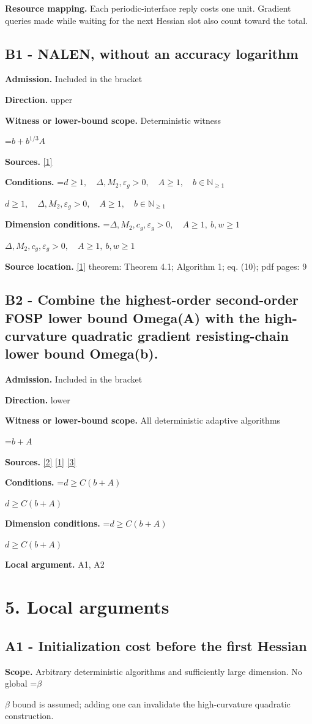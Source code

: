 \documentclass[10pt,a4paper]{article}
\newcommand{\AtlasMath}[1]{\par\begingroup\centering\setbox0=\hbox{$\displaystyle #1$}\ifdim\wd0>1.4\linewidth\typeout{ATLAS WIDE FORMULA: \the\wd0}\fi\ifdim\wd0>\linewidth\resizebox{\linewidth}{!}{\box0}\else\box0\fi\par\endgroup}
\newcommand{\AtlasInlineMath}[1]{\begingroup\setbox0=\hbox{$#1$}\ifdim\wd0>.4\linewidth\endgroup\AtlasMath{#1}\else\endgroup$#1$\fi}
\begin{document}
\textbf{Resource mapping.} Each periodic-interface reply costs one unit. Gradient queries made while waiting for the next Hessian slot also count toward the total.

\subsection{B1 - NALEN, without an accuracy logarithm}
\textbf{Admission.} Included in the bracket

\textbf{Direction.} upper

\textbf{Witness or lower-bound scope.} Deterministic witness

\AtlasMath{b+b^{1/3}A}
\textbf{Sources.} \href{https://arxiv.org/abs/2501.17488v3}{[1]}

\textbf{Conditions.} \AtlasInlineMath{d\ge1,\quad\Delta,M_2,\varepsilon_g>0,\quad A\ge1,\quad b\in\mathbb{N}_{\ge1}}

\textbf{Dimension conditions.} \AtlasInlineMath{\Delta,M_2,c_g,\varepsilon_g>0,\quad A\ge1,\ b,w\ge1}

\textbf{Source location.} \href{https://arxiv.org/abs/2501.17488v3}{[1]} theorem: Theorem 4.1; Algorithm 1; eq. (10); pdf pages: 9

\subsection{B2 - Combine the highest-order second-order FOSP lower bound Omega(A) with the high-curvature quadratic gradient resisting-chain lower bound Omega(b).}
\textbf{Admission.} Included in the bracket

\textbf{Direction.} lower

\textbf{Witness or lower-bound scope.} All deterministic adaptive algorithms

\AtlasMath{b+A}
\textbf{Sources.} \href{https://arxiv.org/abs/1710.11606v3}{[2]} \href{https://arxiv.org/abs/2501.17488v3}{[1]} \href{https://arxiv.org/abs/2610.03222v1}{[3]}

\textbf{Conditions.} \AtlasInlineMath{d\ge C(b+A)}

\textbf{Dimension conditions.} \AtlasInlineMath{d\ge C(b+A)}

\textbf{Local argument.} A1, A2

\section{5. Local arguments}
\subsection{A1 - Initialization cost before the first Hessian}
\textbf{Scope.} Arbitrary deterministic algorithms and sufficiently large dimension. No global \AtlasInlineMath{\beta} bound is assumed; adding one can invalidate the high-curvature quadratic construction.
\end{document}
